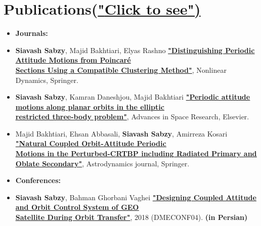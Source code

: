 \documentclass[10pt,a4paper,times]{moderncv}
\begin{document}
\section{Publications(\href{https://scholar.google.com/citations?user=pz4gpScAAAAJ&hl=en}{"\underline{Click to see}")}}
\begin{itemize}

\item\textbf{Journals:}
\item \textbf{Siavash Sabzy}, Majid Bakhtiari, Elyas Rashno 
\textbf{\href{https://link.springer.com/article/10.1007/s11071-024-09288-2}{"\underline{Distinguishing Periodic Attitude Motions from Poincaré} \\ \underline{Sections Using a Compatible Clustering Method}"}}, Nonlinear Dynamics, Springer.
\item \textbf{Siavash Sabzy}, Kamran Daneshjou, Majid Bakhtiari 
 \textbf{\href{https://doi.org/10.1016/j.asr.2021.01.019}{"\underline{Periodic attitude motions along planar orbits in the elliptic } \\ \underline{restricted three-body problem}"}}, Advances in Space Research, Elsevier.
\item  Majid Bakhtiari, Ehsan Abbasali, \textbf{Siavash Sabzy}, Amirreza Kosari 
 \textbf{\href{https://link.springer.com/article/10.1007/s42064-022-0154-0}{"\underline{Natural Coupled Orbit-Attitude Periodic } \\ \underline{Motions in the Perturbed-CRTBP including Radiated Primary and Oblate Secondary}"}}, Astrodynamics journal, Springer. \\


\item\textbf{Conferences:}
\item \textbf{Siavash Sabzy}, Bahman Ghorbani Vaghei
 \textbf{\href{https://civilica.com/doc/881918/}{"\underline{Designing Coupled Attitude and Orbit Control System of GEO} \\ \href{https://civilica.com/doc/881918/}{\underline{Satellite During Orbit Transfer"}}}}, 2018 (DMECONF04). \textbf{(in Persian)}
 

\end{itemize}
\end{document}

